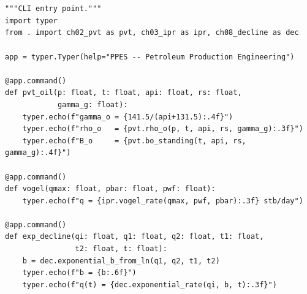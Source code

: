 \documentclass[10pt,a4paper,openany]{book}
\begin{document}
\chapter{}
\begin{lstlisting}
"""CLI entry point."""
import typer
from . import ch02_pvt as pvt, ch03_ipr as ipr, ch08_decline as dec

app = typer.Typer(help="PPES -- Petroleum Production Engineering")

@app.command()
def pvt_oil(p: float, t: float, api: float, rs: float,
            gamma_g: float):
    typer.echo(f"gamma_o = {141.5/(api+131.5):.4f}")
    typer.echo(f"rho_o   = {pvt.rho_o(p, t, api, rs, gamma_g):.3f}")
    typer.echo(f"B_o     = {pvt.bo_standing(t, api, rs, gamma_g):.4f}")

@app.command()
def vogel(qmax: float, pbar: float, pwf: float):
    typer.echo(f"q = {ipr.vogel_rate(qmax, pwf, pbar):.3f} stb/day")

@app.command()
def exp_decline(qi: float, q1: float, q2: float, t1: float,
                t2: float, t: float):
    b = dec.exponential_b_from_ln(q1, q2, t1, t2)
    typer.echo(f"b = {b:.6f}")
    typer.echo(f"q(t) = {dec.exponential_rate(qi, b, t):.3f}")
\end{lstlisting}
\end{document}
